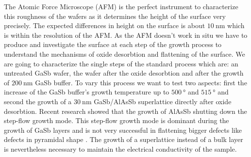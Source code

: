 %


The Atomic Force Microscope (AFM) is the perfect instrument to characterize this roughness of the wafers as it determines the height of the surface very precisely. The expected differences in height on the surface is about $\SI{10}{\nano\meter}$ which is within the resolution of the AFM.
As the AFM doesn't work in situ we have to produce and investigate the surface at each step of the growth process to understand the mechanisms of oxide desorbtion and flattening of the surface. We are going to characterize the single steps of the standard process which are: an untreated GaSb wafer, the wafer after the oxide desorbtion and after the growth of $\SI{200}{\nano\meter}$ GaSb buffer. To vary this process we want to test two aspects: first the increase of the GaSb buffer's growth temperature up to $\SI{500}{\degree}$ and $\SI{515}{\degree}$ and second the growth of a $\SI{30}{\nano\meter}$ GaSb/AlAsSb superlattice directly after oxide desorbtion. Recent research showed that the growth of AlAsSb shutting down the step-flow growth mode. This  step-flow growth mode is dominant during the growth of GaSb layers and is not very successful in flattening bigger defects like defects in pyramidal shape \cite{murray}. The growth of a superlattice instead of a bulk layer is nevertheless necessary to maintain the electrical conductivity of the sample.
